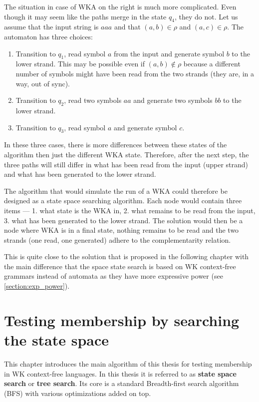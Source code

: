 The situation in case of WKA on the right is much more complicated. Even though it may seem like the paths merge in the state $q_4$, they do not. Let us assume that the input string is $aaa$ and that $(a, b) \in \rho$ and $(a, c) \in \rho$. The automaton has three choices:

\begin{enumerate}
  \item{Transition to $q_1$, read symbol $a$ from the input and generate symbol $b$ to the lower strand. This may be possible even if $(a, b) \notin \rho$ because a different number of symbols might have been read from the two strands (they are, in a way, out of sync).}

  \item{Transition to $q_2$, read two symbols $aa$ and generate two symbols $bb$ to the lower strand.}

  \item{Transition to $q_3$, read symbol $a$ and generate symbol $c$.}
\end{enumerate}

In these three cases, there is more differences between these states of the algorithm then just the different WKA state. Therefore, after the next step, the three paths will still differ in what has been read from the input (upper strand) and what has been generated to the lower strand.

The algorithm that would simulate the run of a WKA could therefore be designed as a state space searching algorithm. Each node would contain three items --- 1. what state is the WKA in, 2. what remains to be read from the input, 3. what has been generated to the lower strand. The solution would then be a node where WKA is in a final state, nothing remains to be read and the two strands (one read, one generated) adhere to the complementarity relation.

This is quite close to the solution that is proposed in the following chapter with the main difference that the space state search is based on WK context-free grammars instead of automata as they have more expressive power (see \ref{section:exp_power}).

\chapter{Testing membership by searching the state space} \label{chapter:parse_tree}
This chapter introduces the main algorithm of this thesis for testing membership in WK context-free languages. In this thesis it is referred to as \textbf{state space search} or \textbf{tree search}. Its core is a standard Breadth-first search algorithm (BFS) with various optimizations added on top.

